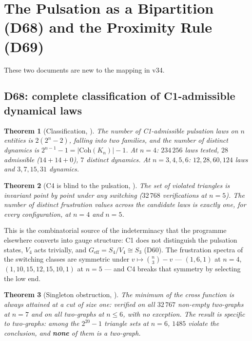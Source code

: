 \documentclass[11pt,a4paper]{article}
\theoremstyle{plain}
\newtheorem{theorem}{Theorem}[section]
\theoremstyle{definition}
\theoremstyle{remark}
\begin{document}
\section{The Pulsation as a Bipartition (D68) and the Proximity Rule (D69)}
\label{sec:D68D69}

These two documents are new to the mapping in v34.

\subsection{D68: complete classification of C1-admissible dynamical laws}
\label{subsec:D68}
\begin{theorem}[Classification, \cite{D68}]
\label{thm:D68class}
The number of C1-admissible pulsation laws on $n$ entities is $2(2^n-2)$, falling into two families, and the number of distinct dynamics is $2^{n-1}-1=|\mathrm{Coh}(K_n)|-1$. At $n=4$: $234\,256$ laws tested, $28$ admissible ($14+14+0$), $7$ distinct dynamics. At $n=3,4,5,6$: $12,28,60,124$ laws and $3,7,15,31$ dynamics.
\end{theorem}

\begin{theorem}[C4 is blind to the pulsation, \cite{D68}]
\label{thm:D68blind}
The set of violated triangles is invariant \emph{point by point} under any switching ($32\,768$ verifications at $n=5$). The number of distinct frustration values across the candidate laws is exactly one, for every configuration, at $n=4$ and $n=5$.
\end{theorem}

This is the combinatorial source of the indeterminacy that the programme elsewhere converts into gauge structure: C1 does not distinguish the pulsation states, $V_4$ acts trivially, and $G_{\mathrm{eff}}=S_4/V_4\cong S_3$ (D60). The frustration spectra of the switching classes are symmetric under $v\mapsto\binom{n}{3}-v$ --- $(1,6,1)$ at $n=4$, $(1,10,15,12,15,10,1)$ at $n=5$ --- and C4 breaks that symmetry by selecting the low end.

\begin{theorem}[Singleton obstruction, \cite{D68}]
\label{thm:D68singleton}
The minimum of the cross function is always attained at a cut of size one: verified on all $32\,767$ non-empty two-graphs at $n=7$ and on all two-graphs at $n\leq6$, with no exception. The result is specific to two-graphs: among the $2^{20}-1$ triangle sets at $n=6$, $1485$ violate the conclusion, and \textbf{none} of them is a two-graph.
\end{theorem}
\end{document}
